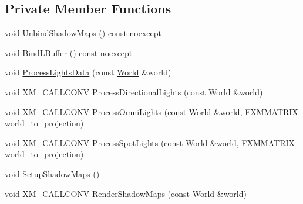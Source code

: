\subsection*{Private Member Functions}
\begin{DoxyCompactItemize}
\item 
void \hyperlink{classmage_1_1rendering_1_1_l_buffer_pass_ac456e0612e540d215d8c709e705ade20}{Unbind\+Shadow\+Maps} () const noexcept
\item 
void \hyperlink{classmage_1_1rendering_1_1_l_buffer_pass_a23370698fd80713b0ea31e1d54a35d44}{Bind\+L\+Buffer} () const noexcept
\item 
void \hyperlink{classmage_1_1rendering_1_1_l_buffer_pass_a1ec1d116e0b9ec1066faa7a2b3db5ca5}{Process\+Lights\+Data} (const \hyperlink{classmage_1_1rendering_1_1_world}{World} \&world)
\item 
void X\+M\+\_\+\+C\+A\+L\+L\+C\+O\+NV \hyperlink{classmage_1_1rendering_1_1_l_buffer_pass_a97047b8acf6e4e552ab8f7b7ec08b1be}{Process\+Directional\+Lights} (const \hyperlink{classmage_1_1rendering_1_1_world}{World} \&world)
\item 
void X\+M\+\_\+\+C\+A\+L\+L\+C\+O\+NV \hyperlink{classmage_1_1rendering_1_1_l_buffer_pass_af9e7e859505ec7ee16155f4e11d98a67}{Process\+Omni\+Lights} (const \hyperlink{classmage_1_1rendering_1_1_world}{World} \&world, F\+X\+M\+M\+A\+T\+R\+IX world\+\_\+to\+\_\+projection)
\item 
void X\+M\+\_\+\+C\+A\+L\+L\+C\+O\+NV \hyperlink{classmage_1_1rendering_1_1_l_buffer_pass_a3172ee6a91c34a1dbf252c388fe1ac20}{Process\+Spot\+Lights} (const \hyperlink{classmage_1_1rendering_1_1_world}{World} \&world, F\+X\+M\+M\+A\+T\+R\+IX world\+\_\+to\+\_\+projection)
\item 
void \hyperlink{classmage_1_1rendering_1_1_l_buffer_pass_a405734dad82467908e68217254e4f2ad}{Setup\+Shadow\+Maps} ()
\item 
void X\+M\+\_\+\+C\+A\+L\+L\+C\+O\+NV \hyperlink{classmage_1_1rendering_1_1_l_buffer_pass_a811b69ff4df7d8a24a042a9677c4b67f}{Render\+Shadow\+Maps} (const \hyperlink{classmage_1_1rendering_1_1_world}{World} \&world)
\end{DoxyCompactItemize}
